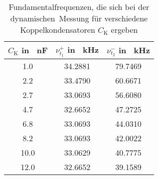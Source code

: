 \begin{table}[h!]
\begin{center}
\begin{tabular}{c | c | c}
	$C_\text{K}$ in \SI{}{\nano\farad} & $\nu_{t_1}^+$ in \SI{}{\kilo\hertz} & $\nu_{t_2}^-$ in \SI{}{\kilo\hertz} \\
\hline
	1.0 & 34.2881 & 79.7469 \\
	2.2 & 33.4790 & 60.6671 \\
	2.7 & 33.0693 & 56.6080 \\
	4.7 & 32.6652 & 47.2725 \\
	6.8 & 33.0693 & 44.0310 \\
	8.2 & 33.0693 & 42.0022 \\
	10.0 & 33.0629 & 40.7775 \\
	12.0 & 32.6652 & 39.1589 \\
\end{tabular}
\end{center}
\caption{Fundamentalfrequenzen, die sich bei der \glqq dynamischen\grqq\ Messung für verschiedene Koppelkondensatoren $C_\text{K}$ ergeben}
\label{fig:Freq_dyn}
\end{table}
